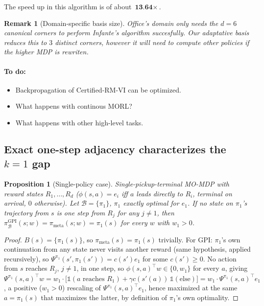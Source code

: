\documentclass[11pt]{article}
\newtheorem{proposition}{Proposition}
\newtheorem{remark}{Remark}
\begin{document}
The speed up in this algorithm is of about $\textbf{13.64} \times$.

\begin{remark}[Domain-specific basis size]
Office's domain only needs the $d=6$ canonical corners to perform Infante's algorithm succesfully. Our adaptative basis reduces this to $3$ distinct corners, however it will need to compute other policies if the higher MDP is rewriten.
\end{remark}


\paragraph{To do:}

\begin{itemize}
    \item Backpropagation of Certified-RM-VI can be optimized. 
    \item What happens with continous MORL? 
    \item What happens with other high-level tasks.
\end{itemize}


\subsection{Exact one-step adjacency characterizes the $k=1$ gap}

\begin{proposition}[Single-policy case]\label{prop:adjacency}
Single-pickup-terminal MO-MDP with reward states $R_1,\dots,R_d$ ($\phi(s,a)=e_i$ iff $a$ leads directly to $R_i$,
terminal on arrival, $0$ otherwise). Let $\mathcal B=\{\pi_1\}$, $\pi_1$ exactly optimal for $e_1$. If no state on
$\pi_1$'s trajectory from $s$ is one step from $R_j$ for any $j\ne1$, then
$\pi^{\mathrm{GPI}}_{\mathcal B}(s;w)=\pi_{\mathrm{meta}}(s;w)=\pi_1(s)$ for every $w$ with $w_1>0$.
\end{proposition}

\begin{proof}
$B(s)=\{\pi_1(s)\}$, so $\pi_{\mathrm{meta}}(s)=\pi_1(s)$ trivially. For GPI: $\pi_1$'s own continuation from any
state never visits another reward (same hypothesis, applied recursively), so
$\Psi^{\pi_1}(s',\pi_1(s'))=c(s')e_1$ for some $c(s')\ge0$. No action from $s$ reaches $R_j$, $j\ne1$, in one step,
so $\phi(s,a)^\top w\in\{0,w_1\}$ for every $a$, giving
$\Psi^{\pi_1}(s,a)^\top w = w_1\cdot\big[\mathbb 1(a\text{ reaches }R_1)+\gamma c(s'(a))\,\mathbb 1(\text{else})\big]
= w_1\cdot\Psi^{\pi_1}(s,a)^\top e_1$,
a positive ($w_1>0$) rescaling of $\Psi^{\pi_1}(s,a)^\top e_1$, hence maximized at the same $a=\pi_1(s)$ that
maximizes the latter, by definition of $\pi_1$'s own optimality.
\end{proof}
\end{document}

